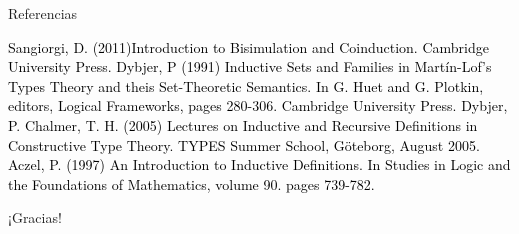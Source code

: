 \documentclass[dvipsnames, 8pt]{beamer} %
\theoremstyle{plain}
\theoremstyle{definition}
\begin{document}
\begin{frame}{Referencias}
    \begin{thebibliography}{9}
        \textcolor{black}{Sangiorgi, D. (2011)Introduction to Bisimulation and Coinduction.
        Cambridge University Press.
        }
        \textcolor{black}{Dybjer, P (1991)
        Inductive Sets and Families in Martín-Lof's Types Theory and theis Set-Theoretic Semantics. In G. Huet and G. Plotkin, editors, Logical Frameworks, pages 280-306. Cambridge University Press.
        }
        \textcolor{black}{Dybjer, P. Chalmer, T. H. (2005)
        Lectures on Inductive and Recursive Definitions in Constructive Type Theory. TYPES Summer School, Göteborg, August 2005.
        }
        \textcolor{black}{Aczel, P. (1997)
        An Introduction to Inductive Definitions. In Studies in Logic and the Foundations of Mathematics, volume 90. pages 739-782.
        }
    \end{thebibliography}
\end{frame}

\begin{frame}
    \begin{center}
        {\Huge\calligra ¡Gracias!}
    \end{center}
\end{frame}
\end{document}

